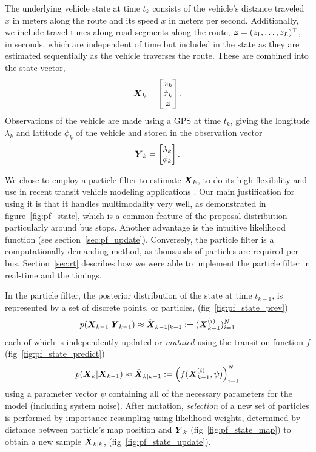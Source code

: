 The underlying vehicle state at time $t_k$ consists of
the vehicle's distance traveled $x$ in meters along the route and
its speed $\dot x$ in meters per second.
Additionally, we include travel times along road segments along the route, 
$\boldsymbol{z} = (z_1,\ldots,z_L)^\top$, in seconds,
which are independent of time but included in the state as they are estimated
sequentially as the vehicle traverses the route.
These are combined into the state vector,
\begin{equation}
\label{eq:vehicle_state}
\mbox{$\boldsymbol{X}$}_k = 
\begin{bmatrix}
    x_k \\ \dot x_k \\ \boldsymbol{z}
\end{bmatrix}.
\end{equation}
Observations of the vehicle are made using a GPS at time $t_k$,
giving the longitude $\lambda_k$ and latitude $\phi_k$ of the vehicle
and stored in the observation vector
\begin{equation}
\label{eq:vehicle_obs}
\mbox{$\boldsymbol{Y}$}_k = \begin{bmatrix} \lambda_k \\ \phi_k \end{bmatrix}.
\end{equation}


We chose to employ a particle filter to estimate $\mbox{$\boldsymbol{X}$}_k$,
to do its high flexibility and use in recent 
transit vehicle modeling applications \citep{Hans_2015}.
Our main justification for using it is that it handles multimodality very well,
as demonstrated in figure~\ref{fig:pf_state},
which is a common feature of the proposal distribution particularly around bus stops.
Another advantage is the intuitive likelihood function (see section~\ref{sec:pf_update}).
Conversely, the particle filter is a computationally demanding method,
as thousands of particles are required per bus.
Section~\ref{sec:rt} describes how we were able to implement the particle filter in real-time and the timings.


In the particle filter, the posterior distribution of the state at time $t_{k-1}$,
is represented by a set of discrete points, or particles, (fig~\ref{fig:pf_state_prev})
\begin{equation}
p(\mbox{$\boldsymbol{X}$}_{k-1} | \mbox{$\boldsymbol{Y}$}_{k-1}) \approx \tilde{\mbox{$\boldsymbol{X}$}}_{k-1|k-1} := (\mbox{$\boldsymbol{X}$}_{k-1}^{(i)})_{i=1}^N
\end{equation}
each of which is independently updated or \emph{mutated} using the transition function $f$ (fig~\ref{fig:pf_state_predict})
\begin{equation}
p(\mbox{$\boldsymbol{X}$}_k | \mbox{$\boldsymbol{X}$}_{k-1}) \approx \tilde{\mbox{$\boldsymbol{X}$}}_{k|k-1} := 
\left(f(\mbox{$\boldsymbol{X}$}_{k-1}^{(i)}, \psi)\right)_{i=1}^N
\end{equation}
using a parameter vector $\psi$ containing all of the necessary parameters
for the model (including system noise).
After mutation, \emph{selection} of a new set of particles is performed by
importance resampling using likelihood weights,
determined by distance between particle's map position and $\mbox{$\boldsymbol{Y}$}_k$ (fig~\ref{fig:pf_state_map})
to obtain a new sample $\tilde{\mbox{$\boldsymbol{X}$}}_{k|k}$, (fig~\ref{fig:pf_state_update}).


